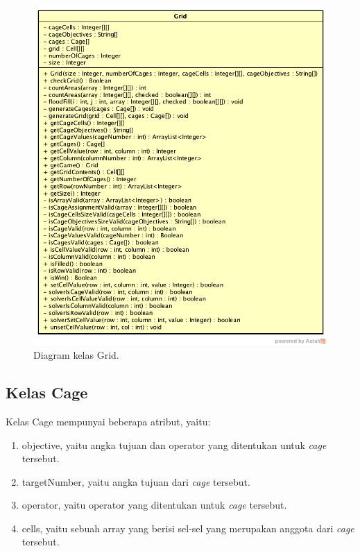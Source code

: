 \begin{figure}
\centering
\captionsetup{justification=centering}
\includegraphics[scale=0.5]{Gambar/Perancangan/DiagramKelasGrid.png}
\caption[Diagram kelas Grid.]{Diagram kelas Grid.}
\label{fig:diagramkelasgrid}
\end{figure}

\subsection{Kelas Cage}
\label{sec:kelascage}

Kelas Cage mempunyai beberapa atribut, yaitu:

\begin{enumerate}
\item objective, yaitu angka tujuan dan operator yang ditentukan untuk \textit{cage} tersebut.
\item targetNumber, yaitu angka tujuan dari \textit{cage} tersebut.
\item operator, yaitu operator yang ditentukan untuk \textit{cage} tersebut.
\item cells, yaitu sebuah array yang berisi sel-sel yang merupakan anggota dari \textit{cage} tersebut.
\end{enumerate}

